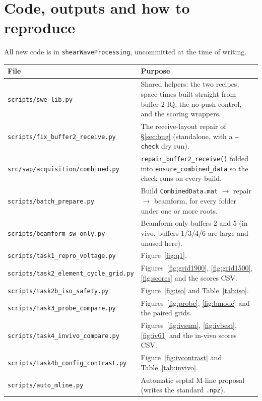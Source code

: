 \documentclass[11pt,a4paper]{article}
\begin{document}
\appendix
\section{Code, outputs and how to reproduce}
All new code is in \texttt{shearWaveProcessing}, uncommitted at the time of writing.

\begin{longtable}{@{}p{6.0cm}p{10.2cm}@{}}
\toprule
\textbf{File} & \textbf{Purpose} \\
\midrule
\endhead
\texttt{scripts/swe\_lib.py} & Shared helpers: the two recipes, space-times built straight from
buffer-2 IQ, the no-push control, and the scoring wrappers. \\
\texttt{scripts/fix\_buffer2\_receive.py} & The receive-layout repair of \S\ref{sec:bug} (standalone,
with a \texttt{--check} dry run). \\
\texttt{src/swp/acquisition/combined.py} & \texttt{repair\_buffer2\_receive()} folded into
\texttt{ensure\_combined\_data} so the check runs on every build. \\
\texttt{scripts/batch\_prepare.py} & Build \texttt{CombinedData.mat} $\rightarrow$ repair $\rightarrow$
beamform, for every folder under one or more roots. \\
\texttt{scripts/beamform\_sw\_only.py} & Beamform only buffers 2 and 5 (in vivo, buffers 1/3/4/6 are
large and unused here). \\
\texttt{scripts/task1\_repro\_voltage.py} & Figure~\ref{fig:q1}. \\
\texttt{scripts/task2\_element\_cycle\_grid.py} & Figures~\ref{fig:grid1900}, \ref{fig:grid1500},
\ref{fig:scores} and the scores CSV. \\
\texttt{scripts/task2b\_iso\_safety.py} & Figure~\ref{fig:iso} and Table~\ref{tab:iso}. \\
\texttt{scripts/task3\_probe\_compare.py} & Figures~\ref{fig:probe}, \ref{fig:bmode} and the paired
grids. \\
\texttt{scripts/task4\_invivo\_compare.py} & Figures~\ref{fig:ivsum}, \ref{fig:ivbest}, \ref{fig:iv61}
and the in-vivo scores CSV. \\
\texttt{scripts/task4b\_config\_contrast.py} & Figure~\ref{fig:ivcontrast} and Table~\ref{tab:invivo}. \\
\texttt{scripts/auto\_mline.py} & Automatic septal M-line proposal (writes the standard
\texttt{.npz}). \\

\end{longtable}
\end{document}
